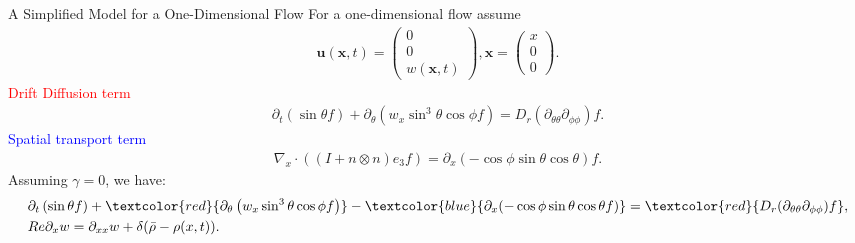 \begin{frame}{A Simplified Model for a One-Dimensional Flow}
	\scriptsize
For a one-dimensional flow assume
	\begin{align*}
		\boldsymbol{u}(\boldsymbol{x},t) =  \left(\begin{array}{c}
			0 \\
			0 \\
			w(\boldsymbol{x},t)
		\end{array}\right),
		\boldsymbol{x} = \left(\begin{array}{l}
			x \\
			0 \\
			0
		\end{array}\right).
	\end{align*}
\textcolor{red}{Drift Diffusion term} 
    \begin{align*}
	\partial_{t}\left(\sin \theta f\right)+ \partial_\theta\left(w_x \sin ^3 \theta \cos \phi f\right)
	=D_{r}(\partial_{\theta\theta}\partial_{\phi\phi})f.
    \end{align*}
\textcolor{blue}{Spatial transport term}
   \begin{align*}
   	\nabla_x \cdot ((I+n \otimes n)e_3f) =\partial_x( -\cos\phi \sin\theta \cos\theta)f.
   \end{align*}
 	Assuming $\gamma = 0$, we have:
 \begin{align*}
 	&\partial_{t}\left(\sin \theta f\right)+ \textcolor{red}{\partial_\theta\left(w_x \sin ^3 \theta \cos \phi f\right)} - \textcolor{blue}{\partial_x(-\cos\phi \sin\theta \cos\theta f)}
 	= \textcolor{red}{D_{r}(\partial_{\theta\theta}\partial_{\phi\phi})f}, \\
 	&Re\partial_{x}w = \partial_{xx}w + \delta(\bar{\rho}-\rho(x,t)).
 \end{align*}
\end{frame}


